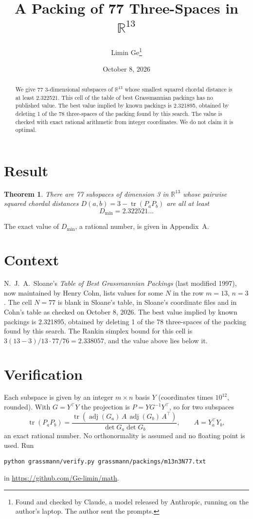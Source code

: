 \documentclass[11pt,a4paper]{article}
\title{A Packing of 77 Three-Spaces in $\mathbb{R}^{13}$}
\author{Limin Ge\thanks{Found and checked by Claude, a model released by Anthropic, running on the author's laptop. The author sent the prompts.}}
\date{October 8, 2026}
\newtheorem*{theorem}{Theorem}
\begin{document}
\maketitle
\begin{abstract}
We give 77 3-dimensional subspaces of $\mathbb{R}^{13}$ whose smallest squared chordal distance is at least 2.322521. This cell of the table of best Grassmannian packings has no published value. The best value implied by known packings is 2.321895, obtained by deleting 1 of the 78 three-spaces of the packing found by this search. The value is checked with exact rational arithmetic from integer coordinates. We do not claim it is optimal.
\end{abstract}

\section{Result}
\begin{theorem}
There are 77 subspaces of dimension 3 in $\mathbb{R}^{13}$ whose pairwise squared chordal distances $D(a,b) = 3 - \operatorname{tr}(P_aP_b)$ are all at least
\[ D_{\min} = 2.322521\ldots \]
\end{theorem}
The exact value of $D_{\min}$, a rational number, is given in Appendix~A.


\section{Context}
N.~J.~A.~Sloane's \emph{Table of Best Grassmannian Packings} (last modified 1997), now maintained by Henry Cohn, lists values for some $N$ in the row $m=13$, $n=3$. The cell $N=77$ is blank in Sloane's table, in Sloane's coordinate files and in Cohn's table as checked on October 8, 2026. The best value implied by known packings is 2.321895, obtained by deleting 1 of the 78 three-spaces of the packing found by this search. The Rankin simplex bound for this cell is $3(13-3)/13\cdot 77/76 = 2.338057$, and the value above lies below it.


\section{Verification}
Each subspace is given by an integer $m\times n$ basis $Y$ (coordinates times $10^{12}$, rounded). With $G=Y^\top Y$ the projection is $P=YG^{-1}Y^\top$, so for two subspaces
\[ \operatorname{tr}(P_aP_b)=\frac{\operatorname{tr}(\operatorname{adj}(G_a)\,A\,\operatorname{adj}(G_b)\,A^\top)}{\det G_a\det G_b},\qquad A=Y_a^\top Y_b, \]
an exact rational number. No orthonormality is assumed and no floating point is used. Run
\begin{verbatim}
python grassmann/verify.py grassmann/packings/m13n3N77.txt
\end{verbatim}
in \url{https://github.com/Ge-limin/math}.
\end{document}
